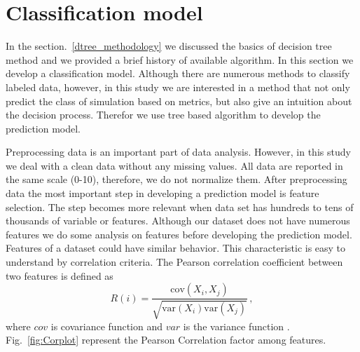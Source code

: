 \section{Classification model} \label{dtree}

In the section.~\ref{dtree_methodology} we discussed the basics of decision tree method and we provided a brief history of available algorithm. In this section we develop a classification model. Although there are numerous methods to classify labeled data, however, in this study we are interested in a method that not only predict the class of simulation based on metrics, but also give an intuition about the decision process. Therefor we use tree based algorithm to develop the prediction model.

Preprocessing data is an important part of data analysis. However, in this study we deal with a clean data without any missing values. All data are reported in the same scale (0-10), therefore, we do not normalize them. After preprocessing data the most important step in developing a prediction model is feature selection. The step becomes more relevant when data set has hundreds to tens of thousands of variable or features. Although our dataset does not have numerous features we do some analysis on features before developing the prediction model. Features of a dataset could have similar behavior. This characteristic is easy to understand by correlation criteria. The Pearson correlation coefficient between two features is defined as
% 
\begin{equation}
    R(i) = \frac{ \mathrm{cov}(X_i,X_j) }{ \sqrt{ \mathrm{var}(X_i) \mathrm{var}(X_j) } }
    \, ,
\end{equation} 
% 
where $cov$ is covariance function and $var$ is the variance function \citep{Guyon_2003}. Fig.~\ref{fig:Corplot} represent the Pearson Correlation factor among features.  

